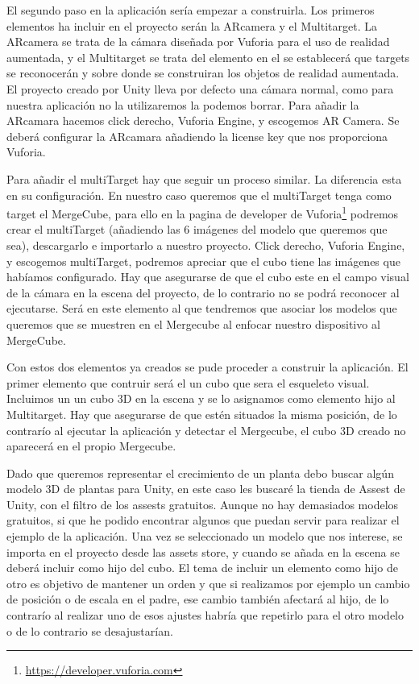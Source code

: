 
El segundo paso en la aplicación sería empezar a construirla. 
Los primeros elementos ha incluir en el proyecto serán la ARcamera y el Multitarget.
La ARcamera se trata de la cámara diseñada por Vuforia para el uso de realidad aumentada, y el Multitarget se trata del elemento en el se establecerá que targets se reconocerán y sobre donde se construiran los objetos de realidad aumentada.
El proyecto creado por Unity lleva por defecto una cámara normal, como para nuestra aplicación no la utilizaremos la podemos borrar.
Para añadir la ARcamara hacemos click derecho, Vuforia Engine, y escogemos AR Camera. Se deberá configurar la ARcamara añadiendo la license key que nos proporciona Vuforia.

Para añadir el multiTarget hay que seguir un proceso similar. La diferencia esta en su configuración. En nuestro caso queremos que el multiTarget tenga como target el MergeCube, para ello en la pagina de developer de Vuforia\footnote{\url{https://developer.vuforia.com}} podremos crear el multiTarget (añadiendo las 6 imágenes del modelo que queremos que sea), descargarlo e importarlo a nuestro proyecto. 
Click derecho, Vuforia Engine, y escogemos multiTarget, podremos apreciar que el cubo tiene las imágenes que habíamos configurado. Hay que asegurarse de que el cubo este en el campo visual de la cámara en la escena del proyecto, de lo contrario no se podrá reconocer al ejecutarse. Será en este elemento al que tendremos que asociar los modelos que queremos que se muestren en el Mergecube al enfocar nuestro dispositivo al MergeCube.

Con estos dos elementos ya creados se pude proceder a construir la aplicación. El primer elemento que contruir será el un cubo que sera el esqueleto visual. Incluimos un un cubo 3D en la escena y se lo asignamos como elemento hijo al Multitarget. Hay que asegurarse de que estén situados la misma posición, de lo contrarío al ejecutar la aplicación y detectar el Mergecube, el cubo 3D creado no aparecerá en el propio Mergecube.

Dado que queremos representar el crecimiento de un planta debo buscar algún modelo 3D de plantas para Unity, en este caso les buscaré la tienda de Assest de Unity, con el filtro de los assests gratuitos. Aunque no hay demasiados modelos gratuitos, si que he podido encontrar algunos que puedan servir para realizar el ejemplo de la aplicación. Una vez se seleccionado un modelo que nos interese, se importa en el proyecto desde las assets store, y cuando se añada en la escena se deberá incluir como hijo del cubo. El tema de incluir un elemento como hijo de otro es objetivo de mantener un orden y que si realizamos por ejemplo un cambio de posición o de escala en el padre, ese cambio también afectará al hijo, de lo contrarío al realizar uno de esos ajustes habría que repetirlo para el otro modelo o de lo contrario se desajustarían.


